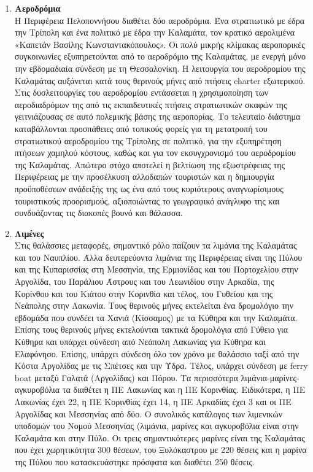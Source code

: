 \documentclass[12pt]{article}
\begin{document}
\begin{enumerate}
		\item \textbf{Αεροδρόμια} \\
		Η Περιφέρεια Πελοποννήσου διαθέτει δύο αεροδρόμια. Ένα στρατιωτικό με έδρα την Τρίπολη και ένα πολιτικό με έδρα την Καλαμάτα, τον κρατικό αερολιμένα «Καπετάν Βασίλης Κωνσταντακόπουλος». Οι πολύ μικρής κλίμακας αεροπορικές συγκοινωνίες εξυπηρετούνται από το αεροδρόμιο της Καλαμάτας, με ενεργή μόνο την εβδομαδιαία σύνδεση με τη Θεσσαλονίκη. Η λειτουργία του αεροδρομίου της Καλαμάτας αυξάνεται κατά τους θερινούς μήνες από πτήσεις charter εξωτερικού. Στις δυσλειτουργίες του αεροδρομίου εντάσσεται η χρησιμοποίηση των αεροδιαδρόμων της από τις εκπαιδευτικές πτήσεις στρατιωτικών σκαφών της γειτνιάζουσας σε αυτό πολεμικής βάσης της αεροπορίας. Το τελευταίο διάστημα καταβάλλονται προσπάθειες από τοπικούς φορείς για τη μετατροπή του στρατιωτικού αεροδρομίου της Τρίπολης σε πολιτικό, για την εξυπηρέτηση πτήσεων χαμηλού κόστους, καθώς και για τον εκσυγχρονισμό του αεροδρομίου της Καλαμάτας. Απώτερο στόχο αποτελεί η βελτίωση της εξωστρέφειας της Περιφέρειας με την προσέλκυση αλλοδαπών τουριστών και η δημιουργία προϋποθέσεων ανάδειξής της ως ένα από τους κυριότερους αναγνωρίσιμους τουριστικούς προορισμούς, αξιοποιώντας το γεωγραφικό ανάγλυφο της και συνδυάζοντας τις διακοπές βουνό και θάλασσα.
		\item \textbf{Λιμένες} \\
		Στις θαλάσσιες μεταφορές, σημαντικό ρόλο παίζουν τα λιμάνια της Καλαμάτας και του Ναυπλίου. Άλλα δευτερεύοντα λιμάνια της Περιφέρειας είναι της Πύλου και της Κυπαρισσίας στη Μεσσηνία, της Ερμιονίδας και του Πορτοχελίου στην Αργολίδα, του Παράλιου Άστρους και του Λεωνιδίου στην Αρκαδία, της Κορίνθου και του Κιάτου στην Κορινθία και τέλος, του Γυθείου και της Νεάπολης στην Λακωνία. Τους θερινούς μήνες εκτελείται ένα δρομολόγιο την εβδομάδα που συνδέει τα Χανιά (Κίσσαμος) με τα Κύθηρα και την Καλαμάτα. Επίσης τους θερινούς μήνες εκτελούνται τακτικά δρομολόγια από Γύθειο για Κύθηρα και υπάρχει σύνδεση από Νεάπολη Λακωνίας για Κύθηρα και Ελαφόνησο. Επίσης, υπάρχει σύνδεση όλο τον χρόνο με θαλάσσιο ταξί από την Κόστα Αργολίδας με τις Σπέτσες και την Ύδρα. Τέλος, υπάρχει σύνδεση με ferry boat μεταξύ Γαλατά (Αργολίδας) και Πόρου. Τα περισσότερα λιμάνια-μαρίνες-αγκυροβόλια τα διαθέτει η ΠΕ Λακωνίας και η ΠΕ Κορινθίας. Ειδικότερα, η ΠΕ Λακωνίας έχει 22, η ΠΕ Κορινθίας έχει 14, η ΠΕ Αρκαδίας έχει 3 και οι ΠΕ Αργολίδας και Μεσσηνίας από δύο. Ο συνολικός κατάλογος των λιμενικών υποδομών του Νομού Μεσσηνίας (λιμάνια, μαρίνες και αγκυροβόλια είναι στην Καλαμάτα και στην Πύλο. Οι τρεις σημαντικότερες μαρίνες είναι της Καλαμάτας που έχει χωρητικότητα 300 θέσεων, του Ξυλόκαστρου με 220 θέσεις και η μαρίνα της Πύλου που κατασκευάστηκε πρόσφατα και διαθέτει 250 θέσεις.
	\end{enumerate}
\end{document}
